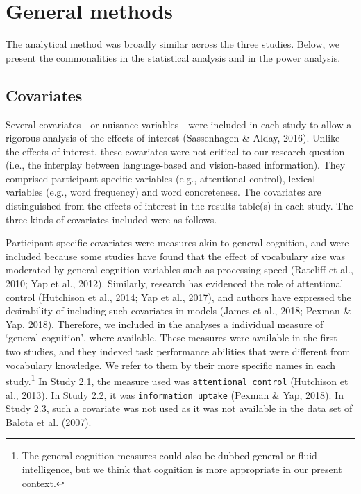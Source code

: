 \documentclass[
  12pt,
  man,floatsintext]{apa7}
\begin{document}
\hypertarget{general-methods}{%
\section{General methods}\label{general-methods}}

The analytical method was broadly similar across the three studies. Below, we present the commonalities in the statistical analysis and in the power analysis.

\hypertarget{covariates}{%
\subsection{Covariates}\label{covariates}}

Several covariates---or nuisance variables---were included in each study to allow a rigorous analysis of the effects of interest (Sassenhagen \& Alday, 2016). Unlike the effects of interest, these covariates were not critical to our research question (i.e., the interplay between language-based and vision-based information). They comprised participant-specific variables (e.g., attentional control), lexical variables (e.g., word frequency) and word concreteness. The covariates are distinguished from the effects of interest in the results table(s) in each study. The three kinds of covariates included were as follows.

Participant-specific covariates were measures akin to general cognition, and were included because some studies have found that the effect of vocabulary size was moderated by general cognition variables such as processing speed (Ratcliff et al., 2010; Yap et al., 2012). Similarly, research has evidenced the role of attentional control (Hutchison et al., 2014; Yap et al., 2017), and authors have expressed the desirability of including such covariates in models (James et al., 2018; Pexman \& Yap, 2018). Therefore, we included in the analyses a individual measure of `general cognition', where available. These measures were available in the first two studies, and they indexed task performance abilities that were different from vocabulary knowledge. We refer to them by their more specific names in each study.\footnote{The general cognition measures could also be dubbed general or fluid intelligence, but we think that cognition is more appropriate in our present context.} In Study 2.1, the measure used was \texttt{attentional\ control} (Hutchison et al., 2013). In Study 2.2, it was \texttt{information\ uptake} (Pexman \& Yap, 2018). In Study 2.3, such a covariate was not used as it was not available in the data set of Balota et al. (2007).
\end{document}
